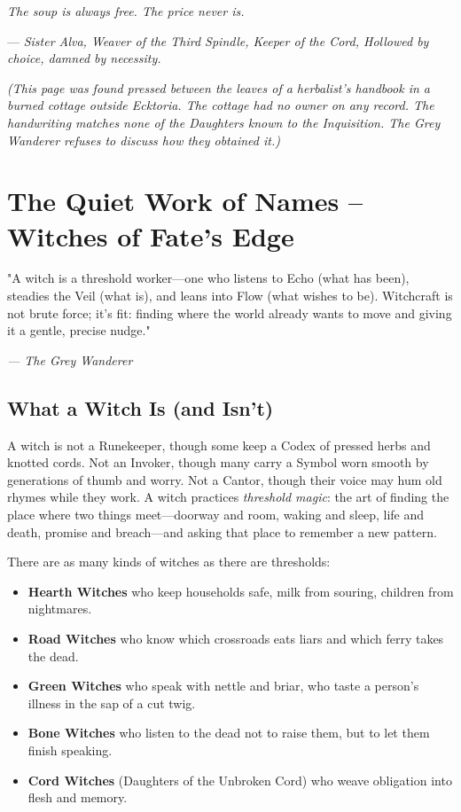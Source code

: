 \documentclass[10pt,a5paper]{book}
\begin{document}
\textit{The soup is always free. The price never is.}

\vspace{1cm}
\hfill --- \textit{Sister Alva, Weaver of the Third Spindle, Keeper of the Cord, Hollowed by choice, damned by necessity.}

\medskip
\textit{(This page was found pressed between the leaves of a herbalist's handbook in a burned cottage outside Ecktoria. The cottage had no owner on any record. The handwriting matches none of the Daughters known to the Inquisition. The Grey Wanderer refuses to discuss how they obtained it.)}

\chapter{The Quiet Work of Names -- Witches of Fate's Edge}

\epigraph{"A witch is a threshold worker---one who listens to Echo (what has been), steadies the Veil (what is), and leans into Flow (what wishes to be). Witchcraft is not brute force; it's fit: finding where the world already wants to move and giving it a gentle, precise nudge."}{\textit{--- The Grey Wanderer}}

\section{What a Witch Is (and Isn't)}

A witch is not a Runekeeper, though some keep a Codex of pressed herbs and knotted cords. Not an Invoker, though many carry a Symbol worn smooth by generations of thumb and worry. Not a Cantor, though their voice may hum old rhymes while they work. A witch practices \textit{threshold magic}: the art of finding the place where two things meet---doorway and room, waking and sleep, life and death, promise and breach---and asking that place to remember a new pattern.

There are as many kinds of witches as there are thresholds:

\begin{itemize}
    \item \textbf{Hearth Witches} who keep households safe, milk from souring, children from nightmares.
    \item \textbf{Road Witches} who know which crossroads eats liars and which ferry takes the dead.
    \item \textbf{Green Witches} who speak with nettle and briar, who taste a person's illness in the sap of a cut twig.
    \item \textbf{Bone Witches} who listen to the dead not to raise them, but to let them finish speaking.
    \item \textbf{Cord Witches} (Daughters of the Unbroken Cord) who weave obligation into flesh and memory.
\end{itemize}
\end{document}
